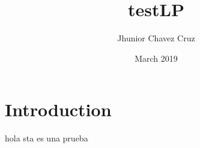 \documentclass{article}
\title{testLP}
\author{Jhunior Chavez Cruz}
\date{March 2019}
\begin{document}
\maketitle

\section{Introduction}
hola sta es una prueba
\end{document}
